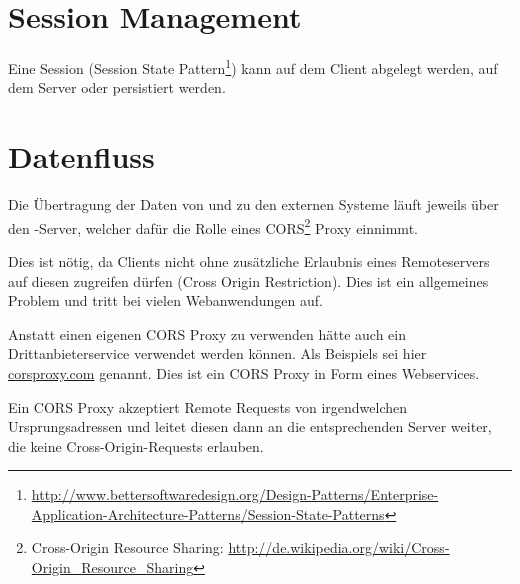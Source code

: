 \section{Session Management}
	Eine Session (Session State Pattern\footnote{\url{http://www.bettersoftwaredesign.org/Design-Patterns/Enterprise-Application-Architecture-Patterns/Session-State-Patterns}}) kann auf dem Client abgelegt werden, auf dem Server oder persistiert werden.
	
		
	\section{Datenfluss}			
		Die Übertragung der Daten von und zu den externen Systeme läuft jeweils über den \eeppi-Server, welcher dafür die Rolle eines CORS\footnote{Cross-Origin Resource Sharing: \url{http://de.wikipedia.org/wiki/Cross-Origin_Resource_Sharing}} Proxy einnimmt. 
		
		Dies ist nötig, da Clients nicht ohne zusätzliche Erlaubnis eines Remoteservers
		auf diesen zugreifen dürfen (Cross Origin Restriction).
		Dies ist ein allgemeines Problem und tritt bei vielen Webanwendungen auf.
		
		Anstatt einen eigenen CORS Proxy zu verwenden hätte auch ein Drittanbieterservice verwendet werden können.
		Als Beispiels sei hier \hyperlink{http://www.corsproxy.com/}{corsproxy.com} genannt.
		Dies ist ein CORS Proxy in Form eines Webservices.

		Ein CORS Proxy akzeptiert Remote Requests von irgendwelchen Ursprungsadressen und leitet diesen dann
		an die entsprechenden Server weiter, die keine Cross-Origin-Requests erlauben.
		
